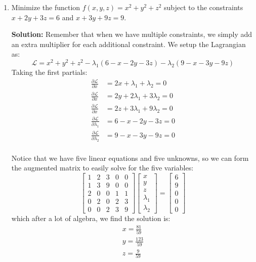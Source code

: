 \documentclass[letterpaper, 11pt]{article}
\begin{document}
\begin{enumerate}
\item Minimize the function $f(x,y,z) = x^2 + y^2 + z^2$ subject to the constraints $x+2y+3z = 6$ and $ x+3y+9z =9$.
\par \textbf{Solution:} Remember that when we have multiple constraints, we simply add an extra multiplier for each additional constraint. We setup the Lagrangian as:
\[ \mathcal{L} = x^2 + y^2 + z^2 - \lambda_1(6 - x - 2y - 3z) - \lambda_2(9 - x - 3y - 9z) \]
Taking the first partials:
\begin{align*}
\frac{\partial \mathcal{L}}{\partial x} &= 2x + \lambda_1 + \lambda_2 = 0 \\
\frac{\partial \mathcal{L}}{\partial x} &= 2y + 2\lambda_1 + 3\lambda_2 = 0 \\
\frac{\partial \mathcal{L}}{\partial x} &= 2z + 3\lambda_1 + 9\lambda_2 = 0 \\
\frac{\partial \mathcal{L}}{\partial \lambda_1} &= 6 - x - 2y - 3z = 0 \\
\frac{\partial \mathcal{L}}{\partial \lambda_2} &= 9 - x - 3y - 9z = 0 \\
\end{align*}

Notice that we have five linear equations and five unknowns, so we can form the augmented matrix to easily solve for the five variables:
\[ \left[ \begin{array}{ccccc} 1 & 2 & 3 & 0 & 0 \\ 1 & 3 & 9 & 0 & 0 \\ 2 & 0 & 0 & 1 & 1 \\ 0 & 2 & 0 & 2 & 3 \\ 0 & 0 & 2 & 3 & 9 \end{array} \right] 
\left[ \begin{array}{c} x \\ y \\ z \\ \lambda_1 \\ \lambda_2 \end{array} \right] = 
\left[ \begin{array}{c} 6 \\ 9 \\ 0 \\ 0 \\ 0 \end{array} \right] \]
which after a lot of algebra, we find the solution is:
\begin{gather*}
x = \frac{81}{59} \\
y = \frac{123}{59} \\
z = \frac{9}{59}
\end{gather*}


\end{enumerate}
\end{document}
